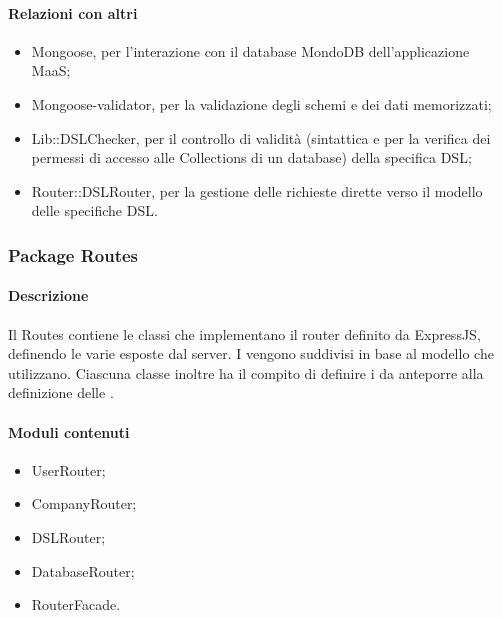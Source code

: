 \paragraph*{Relazioni con altri }
\begin{itemize}
\item Mongoose, per l'interazione con il database MondoDB dell'applicazione MaaS;
\item Mongoose-validator, per la validazione degli schemi e dei dati memorizzati;
\item Lib::DSLChecker, per il controllo di validità (sintattica e per la verifica dei permessi di accesso alle Collections di un database) della specifica DSL;
\item Router::DSLRouter, per la gestione delle richieste dirette verso il modello delle specifiche DSL.
\end{itemize}


\subsubsection{Package Routes}
\paragraph*{Descrizione}
Il  Routes contiene le classi che implementano il router definito da ExpressJS, definendo le varie  esposte dal server.
I  vengono suddivisi in base al modello che utilizzano. 
Ciascuna classe inoltre ha il compito di definire i  da anteporre alla definizione delle .\\

\paragraph*{Moduli contenuti}
\begin{itemize}
\item UserRouter;
\item CompanyRouter;
\item DSLRouter;
\item DatabaseRouter;
\item RouterFacade.
\end{itemize}


